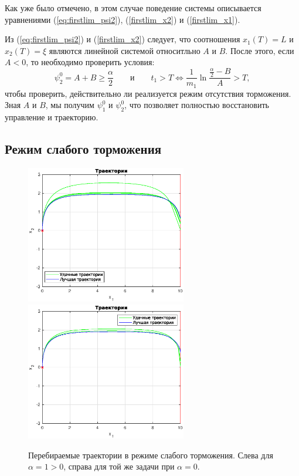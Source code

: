 Как уже было отмечено, в этом случае поведение системы описывается уравнениями (\ref{eq:firstlim_psi2}), (\ref{firstlim_x2}) и (\ref{firstlim_x1}).

Из (\ref{eq:firstlim_psi2}) и (\ref{firstlim_x2}) следует, что соотношения $x_1(T) = L$ и $x_2(T) = \xi$ являются линейной системой относитльно $A$ и $B$. После этого, если $A < 0$, то необходимо проверить условия:
$$
\psi_2^0 = A + B \geqslant \frac{\alpha}{2} \qquad \mbox{и} \qquad t_1 > T \Leftrightarrow \frac{1}{m_1} \ln \frac{\frac{\alpha}{2} - B}{A} > T,
$$
чтобы проверить, действительно ли реализуется режим отсутствия торможения. Зная $A$ и $B$, мы получим $\psi_1^0$ и $\psi_2^0$, что позволяет полностью восстановить управление и траекторию.

\subsection{Режим слабого торможения}

\begin{figure}[h]
        \hfill
        \includegraphics[width=70mm]{first/weak1.eps}
        \hfill
        \hfill
        \includegraphics[width=70mm]{first/weak2.eps}
        \hfill
        \caption{Перебираемые траектории в режиме слабого торможения. Слева для $\alpha = 1 > 0$, справа для той же задачи при $\alpha = 0$.}
\end{figure}

